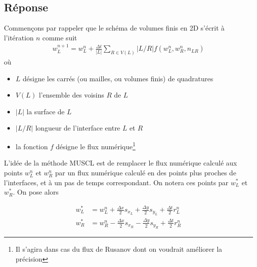 \documentclass[
	french,
	11pt, %
]{fphw}
\begin{document}
\subsection*{Réponse} 
Commençons par rappeler que le schéma de volumes finis en 2D s'écrit à l'itération $n$ comme suit 
\begin{align}
	\label{eq:num2d}
	w^{n+1}_L = w^n_L + \frac{\Delta t}{\vert L \vert } \sum_{R\in V(L)} \vert L/R \vert f(w^n_L, w^n_R, n_{LR})
\end{align}
où
\begin{itemize}
	\item $L$ désigne les carrés (ou mailles, ou volumes finis) de quadratures
	\item $V(L)$ l'ensemble des voisins $R$ de $L$
	\item $\vert L \vert$ la surface de $L$
	\item $\vert L/R \vert$ longueur de l'interface entre $L$ et $R$
	\item la fonction $f$ désigne le flux numérique\footnote{Il s'agira dans cas du flux de Rusanov dont on voudrait améliorer la précision}
\end{itemize}

L'idée de la méthode MUSCL est de remplacer le flux numérique calculé aux points $w^n_L$ et $w^n_R$ par un flux numérique calculé en des points plus proches de l'interfaces, et à un pas de temps correspondant. On notera ces points par $w^*_L$ et $w^*_R$. On pose alors


\begin{equation}	
	\label{eq:muscl}
	\begin{aligned}
		w^*_L &= w^n_L +  \frac{\Delta x}{2} s_{x_L} + \frac{\Delta y}{2} s_{y_L} + \frac{\Delta t}{2} r^n_{L} \\
		w^*_R &= w^n_R - \frac{\Delta x}{2} s_{x_R} - \frac{\Delta y}{2} s_{y_R} + \frac{\Delta t}{2} r^n_{R}
	\end{aligned}
\end{equation}
\end{document}
